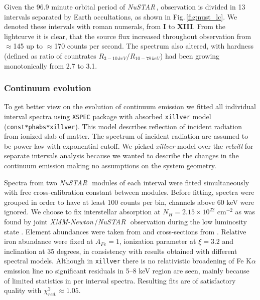 \documentclass[a4paper,fleqn,usenatbib]{mnras}
\def\xmm{{\em XMM-Newton\,}}
\def\nustar{{\em NuSTAR\,}}
\begin{document}
Given the 96.9 minute orbital period of \nustar, observation is divided in 13 intervals separated by Earth occultations, as shown in Fig.\,\ref{fig:nust_lc}. 
We denoted these intervals with roman numerals, from {\bf I} to {\bf XIII}. 
From the lightcurve it is clear, that the source flux increased throughout observation from $\approx$145 up to $\approx$170 counts per second. 
The spectrum also altered, with hardness (defined as ratio of countrates  $R_{3-10\,keV}/R_{10-78\,keV}$) had been growing monotonically from 2.7 to 3.1. 


\subsubsection{Continuum evolution}
To get better view on the evolution of continuum emission we fitted all individual interval spectra using \texttt{XSPEC} package \citep{arnaud96} with absorbed \texttt{xillver} \citep{garcia13} model (\texttt{const*phabs*xillver}). 
This model describes reflection of incident radiation from ionized slab of matter. 
The spectrum of incident radiation are assumed to be power-law with exponential cutoff. 
We picked {\it xillver} model over the {\it relxill} for separate intervals analysis because we wanted to describe the changes in the continuum emission making no assumptions on the system geometry. 

Spectra from two \nustar\, modules of each interval were fitted simultaneously with free cross-calibration constant between modules.
Before fitting, spectra were grouped in order to have at least 100 counts per bin, channels above 60 keV were ignored. 
We choose to fix interstellar absorption at $N_{H} = 2.15\times10^{22}$ cm$^{-2}$ as was found by joint \xmm/\nustar\, observation during the low luminosity state \citep{fuerst16}. 
Element abundances were taken from \cite{wilms00} and cross-sections from \cite{verner96}. 
Relative iron abundance were fixed at  $A_{Fe} = 1$, ionization parameter at $\xi=3.2$ and inclination at 35 degrees, in consistency with \citet{miller15_nust} results obtained with different spectral models. 
Although in  \texttt{xillver} there is no relativistic broadening of Fe K$\alpha$ emission line no significant residuals in 5--8 keV region are seen, mainly because of limited statistics in per interval spectra. 
Resulting fits are of satisfactory quality with $\chi^{2}_{red.} \approx 1.05$. 
 
\end{document}
